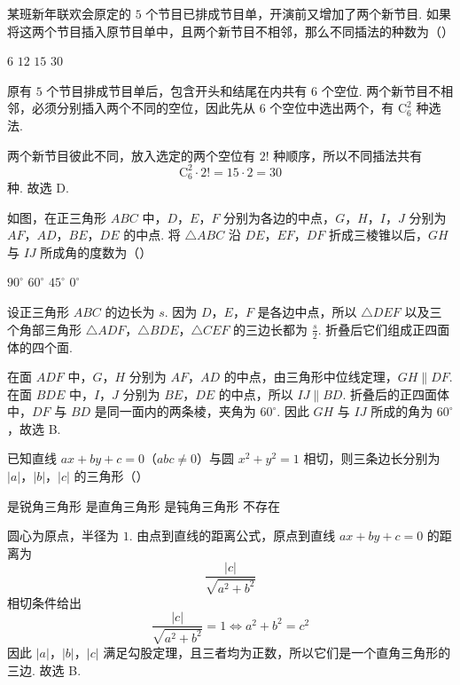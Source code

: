 \begin{problem}
某班新年联欢会原定的 \(5\) 个节目已排成节目单，开演前又增加了两个新节目. 如果将这两个节目插入原节目单中，且两个新节目不相邻，那么不同插法的种数为（\quad）

\choices
    {\(6\)}
    {\(12\)}
    {\(15\)}
    {\(30\)}

\begin{solution}
原有 \(5\) 个节目排成节目单后，包含开头和结尾在内共有 \(6\) 个空位. 两个新节目不相邻，必须分别插入两个不同的空位，因此先从 \(6\) 个空位中选出两个，有 \(\mathrm C_6^2\) 种选法.

两个新节目彼此不同，放入选定的两个空位有 \(2!\) 种顺序，所以不同插法共有
\[
\mathrm C_6^2\cdot2!=15\cdot2=30
\]
种. 故选 D.
\end{solution}
\end{problem}

\begin{problem}
如图，在正三角形 \(ABC\) 中，\(D\)，\(E\)，\(F\) 分别为各边的中点，\(G\)，\(H\)，\(I\)，\(J\) 分别为 \(AF\)，\(AD\)，\(BE\)，\(DE\) 的中点. 将 \(\triangle ABC\) 沿 \(DE\)，\(EF\)，\(DF\) 折成三棱锥以后，\(GH\) 与 \(IJ\) 所成角的度数为（\quad）


\choices
    {\(90^{\circ}\)}
    {\(60^{\circ}\)}
    {\(45^{\circ}\)}
    {\(0^{\circ}\)}

\begin{solution}
设正三角形 \(ABC\) 的边长为 \(s\). 因为 \(D\)，\(E\)，\(F\) 是各边中点，所以 \(\triangle DEF\) 以及三个角部三角形 \(\triangle ADF\)，\(\triangle BDE\)，\(\triangle CEF\) 的三边长都为 \(\frac{s}{2}\). 折叠后它们组成正四面体的四个面.

在面 \(ADF\) 中，\(G\)，\(H\) 分别为 \(AF\)，\(AD\) 的中点，由三角形中位线定理，\(GH\parallel DF\). 在面 \(BDE\) 中，\(I\)，\(J\) 分别为 \(BE\)，\(DE\) 的中点，所以 \(IJ\parallel BD\). 折叠后的正四面体中，\(DF\) 与 \(BD\) 是同一面内的两条棱，夹角为 \(60^{\circ}\). 因此 \(GH\) 与 \(IJ\) 所成的角为 \(60^{\circ}\)，故选 B.
\end{solution}
\end{problem}

\begin{problem}
已知直线 \(ax+by+c=0\)（\(abc\neq0\)）与圆 \(x^2+y^2=1\) 相切，则三条边长分别为 \(\lvert a\rvert\)，\(\lvert b\rvert\)，\(\lvert c\rvert\) 的三角形（\quad）

\choices
    {是锐角三角形}
    {是直角三角形}
    {是钝角三角形}
    {不存在}

\begin{solution}
圆心为原点，半径为 \(1\). 由点到直线的距离公式，原点到直线 \(ax+by+c=0\) 的距离为
\[
\frac{\lvert c\rvert}{\sqrt{a^2+b^2}}
\]
相切条件给出
\[
\frac{\lvert c\rvert}{\sqrt{a^2+b^2}}=1
\Longleftrightarrow a^2+b^2=c^2
\]
因此 \(\lvert a\rvert\)，\(\lvert b\rvert\)，\(\lvert c\rvert\) 满足勾股定理，且三者均为正数，所以它们是一个直角三角形的三边. 故选 B.
\end{solution}
\end{problem}

